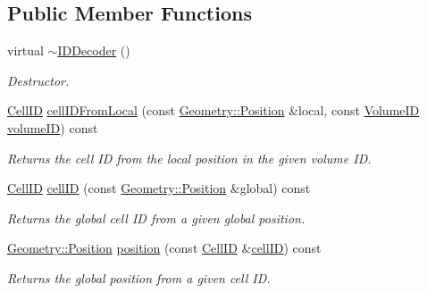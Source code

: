 \subsection*{Public Member Functions}
\begin{DoxyCompactItemize}
\item 
virtual \hyperlink{class_d_d4hep_1_1_d_d_rec_1_1_i_d_decoder_ae33c4d2a1adca58755ef45b8d7c47571}{$\sim$\+I\+D\+Decoder} ()
\begin{DoxyCompactList}\small\item\em Destructor. \end{DoxyCompactList}\item 
\hyperlink{namespace_d_d4hep_1_1_d_d_rec_af5cecc2e566eeaedb430b92df23971d4}{Cell\+ID} \hyperlink{class_d_d4hep_1_1_d_d_rec_1_1_i_d_decoder_a5c5b80ae11b27ff5ef9b639b128f9f60}{cell\+I\+D\+From\+Local} (const \hyperlink{namespace_d_d4hep_1_1_geometry_a55083902099d03506c6db01b80404900}{Geometry\+::\+Position} \&local, const \hyperlink{namespace_d_d4hep_1_1_d_d_rec_a5b5fea15b3678944e1aba487a746bdcb}{Volume\+ID} \hyperlink{class_d_d4hep_1_1_d_d_rec_1_1_i_d_decoder_aec5d8e981dbb6e43171ceed938f4ad1c}{volume\+ID}) const
\begin{DoxyCompactList}\small\item\em Returns the cell ID from the local position in the given volume ID. \end{DoxyCompactList}\item 
\hyperlink{namespace_d_d4hep_1_1_d_d_rec_af5cecc2e566eeaedb430b92df23971d4}{Cell\+ID} \hyperlink{class_d_d4hep_1_1_d_d_rec_1_1_i_d_decoder_abdd26643ae2f9f70de21b3a4699799bb}{cell\+ID} (const \hyperlink{namespace_d_d4hep_1_1_geometry_a55083902099d03506c6db01b80404900}{Geometry\+::\+Position} \&global) const
\begin{DoxyCompactList}\small\item\em Returns the global cell ID from a given global position. \end{DoxyCompactList}\item 
\hyperlink{namespace_d_d4hep_1_1_geometry_a55083902099d03506c6db01b80404900}{Geometry\+::\+Position} \hyperlink{class_d_d4hep_1_1_d_d_rec_1_1_i_d_decoder_a6efa19e0bd4211d9c34c437fc80c15c7}{position} (const \hyperlink{namespace_d_d4hep_1_1_d_d_rec_af5cecc2e566eeaedb430b92df23971d4}{Cell\+ID} \&\hyperlink{class_d_d4hep_1_1_d_d_rec_1_1_i_d_decoder_abdd26643ae2f9f70de21b3a4699799bb}{cell\+ID}) const
\begin{DoxyCompactList}\small\item\em Returns the global position from a given cell ID. \end{DoxyCompactList}\item 

\end{DoxyCompactItemize}
